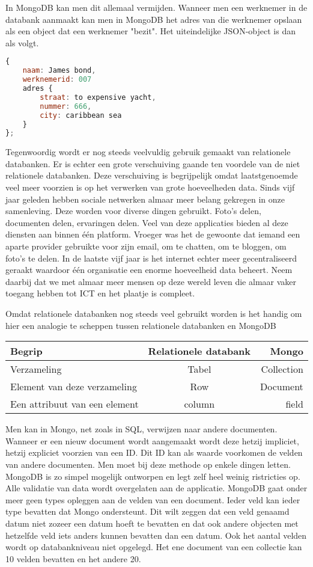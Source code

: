 \documentclass[a4paper,11pt]{article}
\newcommand{\head}[1]{\textnormal{\textbf{#1}}}
\begin{document}
In MongoDB kan men dit allemaal vermijden. Wanneer men een werknemer in de databank aanmaakt kan men in MongoDB het adres van die werknemer opslaan als een object dat een werknemer "bezit". Het uiteindelijke JSON-object is dan als volgt.

\begin{lstlisting}[language=javascript]
{
	naam: James bond,
	werknemerid: 007
	adres {
		straat: to expensive yacht,
		nummer: 666,
		city: caribbean sea
	}
};
\end{lstlisting}

Tegenwoordig wordt er nog steeds veelvuldig gebruik gemaakt van relationele databanken. Er is echter een grote verschuiving gaande ten voordele van de niet relationele databanken. Deze verschuiving is begrijpelijk omdat laatstgenoemde veel meer voorzien is op het verwerken van grote hoeveelheden data. Sinds vijf jaar geleden hebben sociale netwerken almaar meer belang gekregen in onze samenleving. Deze worden voor diverse dingen gebruikt. Foto's delen, documenten delen, ervaringen delen. Veel van deze applicaties bieden al deze diensten aan binnen één platform. Vroeger was het de gewoonte dat iemand een aparte provider gebruikte voor zijn email, om te chatten, om te bloggen, om foto's te delen. In de laatste vijf jaar is het internet echter meer gecentraliseerd geraakt waardoor één organisatie een enorme hoeveelheid data beheert. Neem daarbij dat we met almaar meer mensen op deze wereld leven die almaar vaker toegang hebben tot ICT en het plaatje is compleet.

Omdat relationele databanken nog steeds veel gebruikt worden is het handig om hier een analogie te scheppen tussen relationele databanken en MongoDB

\begin{tabular}{lcr}
\hline
\head{Begrip} & \head{Relationele databank} & \head{Mongo} \\
\hline
Verzameling & Tabel & Collection \\
Element van deze verzameling & Row & Document \\
Een attribuut van een element & column & field

\end{tabular}

Men kan in Mongo, net zoals in SQL, verwijzen naar andere documenten. Wanneer er een nieuw document wordt aangemaakt wordt deze hetzij impliciet, hetzij expliciet voorzien van een ID. Dit ID kan als waarde voorkomen de velden van andere documenten. Men moet bij deze methode op enkele dingen letten. MongoDB is zo simpel mogelijk ontworpen en legt zelf heel weinig ristricties op. Alle validatie van data wordt overgelaten aan de applicatie. MongoDB gaat onder meer geen types opleggen aan de velden van een document. Ieder veld kan ieder type bevatten dat Mongo ondersteunt. Dit wilt zeggen dat een veld genaamd datum niet zozeer een datum hoeft te bevatten en dat ook andere objecten met hetzelfde veld iets anders kunnen bevatten dan een datum. Ook het aantal velden wordt op databankniveau niet opgelegd. Het ene document van een collectie kan 10 velden bevatten en het andere 20.
\end{document}
